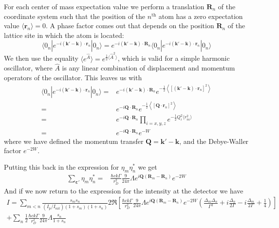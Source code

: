 \documentclass[11pt,letter]{article}
\newcommand{\bv}[1]{\ensuremath{\bm{#1}}}
\newcommand{\iisat}{\ensuremath{I_{\mathrm{p}}/I_{\mathrm{sat}}}}
\begin{document}
For each center of mass expectation value we perform a translation $\bv{R}_{n}$
of the coordinate system such that the position of the $n^{\text{th}}$ atom has
a zero expectation value $\langle \bv{r}_{n} \rangle = 0$.  A phase factor
comes out that depends on the position $\bv{R}_{n}$ of the lattice site in
which the atom is located:
\begin{equation}
      \langle 0_{n} | e^{-i(\bv{k}'-\bv{k}) \cdot\bv{r}_{n}} | 0_{n}  \rangle 
    = e^{-i(\bv{k}'-\bv{k}) \cdot\bv{R}_{n}} 
      \langle 0_{n} | e^{-i(\bv{k}'-\bv{k}) \cdot\bv{r}_{n}} | 0_{n}  \rangle
\end{equation} 
We then use the equality $\langle e^{\hat{A}} \rangle = e^{\frac{1}{2} \langle
\hat{A}^{2} \rangle }$, which is valid for a simple harmonic oscillator, where
$\hat{A}$ is any linear combination of displacement and momentum operators of
the oscillator.  This leaves us with
\begin{equation}
\begin{split}
      \langle 0_{n} | e^{-i(\bv{k}'-\bv{k}) \cdot\bv{r}_{n}} | 0_{n}  \rangle 
    = & e^{-i(\bv{k}'-\bv{k}) \cdot\bv{R}_{n}} 
      e^{ -\frac{1}{2} \left\langle 
          [ (\bv{k}'-\bv{k}) \cdot\bv{r}_{n} ]^{2} \right\rangle } \\
    = & e^{ -i \bv{Q} \cdot \bv{R}_{n}} 
      e^{ -\frac{1}{2} \left\langle [ \bv{Q} \cdot\bv{r}_{n} ]^{2} \right\rangle } \\ 
    = & e^{ -i \bv{Q} \cdot \bv{R}_{n}}
      \prod_{i=x,y,z} e^{ - \frac{1}{2}Q_{i}^{2}\langle r_{ni} ^{2} \rangle } \\ 
    = & e^{ -i \bv{Q} \cdot \bv{R}_{n}}
      e^{-W} 
\end{split}
\end{equation} 
where we have defined the momentum transfer $\bv{Q} = \bv{k}' - \bv{k}$,  and
the Debye-Waller factor $e^{-2W}$. 

Putting this back in the expression for $\eta_{m}\eta_{n}^{*}$ we get
\begin{equation}
\begin{split}
 \sum_{\bv{\varepsilon}' } \eta_{m}\eta_{n}^{*} = & 
 \frac{\hbar c k \Gamma}{r_{D}^{2}}  
    \frac{9}{24\pi} \Lambda
       e^{ i \bv{Q}( \bv{R}_{m} - \bv{R}_{n} ) } e^{-2W} 
\end{split}
\end{equation}
And if we now return to the expression for the intensity at the detector we
have 
\begin{multline}
 I  = 
  \sum_{m<n} 
    \frac{ s_{m} s_{n} } 
         { (\iisat) ( 1+s_{m} )( 1+s_{n} ) }
    2 \Re\left[ 
            \frac{\hbar c k \Gamma}{r_{D}^{2}}  
            \frac{9}{24\pi}  \Lambda
               e^{ i \bv{Q}( \bv{R}_{m} - \bv{R}_{n} ) } e^{-2W}  
    \left(
        \frac{ \Delta_{m} \Delta_{n} }{ \Gamma^{2} } 
      + i \frac{ \Delta_{n} }{ 2 \Gamma } 
      - i \frac{ \Delta_{m} }{ 2 \Gamma } 
      + \frac{1}{4}  
    \right) \right] \\ 
  + \sum_{n}  \frac{1}{2}
    \frac{\hbar c k \Gamma}{r_{D}^{2}}  
    \frac{9}{24\pi} \Lambda
    \frac{ s_{n} } { 1 + s_{n} } 
\end{multline}
\end{document}
